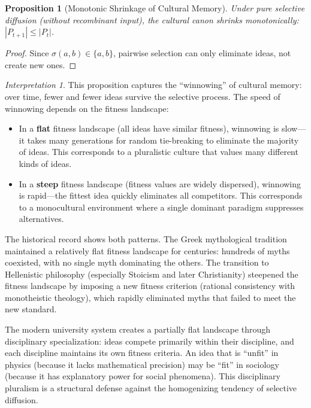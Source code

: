 \documentclass[11pt,openany]{book}
\theoremstyle{definition}
\theoremstyle{plain}
\newtheorem{proposition}[axiom]{Proposition}
\theoremstyle{remark}
\newtheorem{interpretation}[axiom]{Interpretation}
\begin{document}
\begin{proposition}[Monotonic Shrinkage of Cultural Memory]
Under pure selective diffusion (without recombinant input), the cultural canon shrinks monotonically: $|P_{t+1}| \leq |P_t|$.
\end{proposition}

\begin{proof}
Since $\sigma(a, b) \in \{a, b\}$, pairwise selection can only eliminate ideas, not create new ones.
\end{proof}

\begin{interpretation}
This proposition captures the ``winnowing'' of cultural memory: over time, fewer and fewer ideas survive the selective process. The speed of winnowing depends on the fitness landscape:

\begin{itemize}
\item In a \textbf{flat} fitness landscape (all ideas have similar fitness), winnowing is slow---it takes many generations for random tie-breaking to eliminate the majority of ideas. This corresponds to a pluralistic culture that values many different kinds of ideas.
\item In a \textbf{steep} fitness landscape (fitness values are widely dispersed), winnowing is rapid---the fittest idea quickly eliminates all competitors. This corresponds to a monocultural environment where a single dominant paradigm suppresses alternatives.
\end{itemize}

The historical record shows both patterns. The Greek mythological tradition maintained a relatively flat fitness landscape for centuries: hundreds of myths coexisted, with no single myth dominating the others. The transition to Hellenistic philosophy (especially Stoicism and later Christianity) steepened the fitness landscape by imposing a new fitness criterion (rational consistency with monotheistic theology), which rapidly eliminated myths that failed to meet the new standard.

The modern university system creates a partially flat landscape through disciplinary specialization: ideas compete primarily within their discipline, and each discipline maintains its own fitness criteria. An idea that is ``unfit'' in physics (because it lacks mathematical precision) may be ``fit'' in sociology (because it has explanatory power for social phenomena). This disciplinary pluralism is a structural defense against the homogenizing tendency of selective diffusion.
\end{interpretation}
\end{document}
